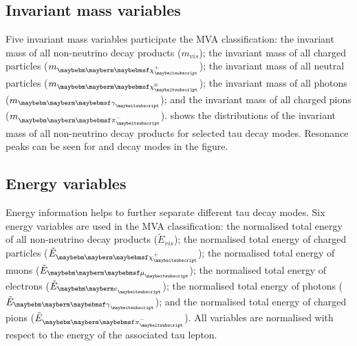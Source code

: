 
\subsection{Invariant mass variables}

Five invariant mass variables participate the MVA classification: the invariant mass of all non-neutrino decay products ($m_{vis}$); the invariant mass of all charged particles ($m_{\charge}$); the invariant mass of all neutral particles ($m_{\neutral}$); the invariant mass of all photons ($m_{\Pgg}$); and the invariant mass of all charged pions ($m_{\Pgpm}$).  shows the distributions of the invariant mass of all non-neutrino decay products for selected tau decay modes. Resonance peaks can be seen for \Prho and \Pai decay modes in the figure.


\subsection{Energy variables}

Energy information helps to further separate different tau decay modes. Six energy variables are used in the MVA classification: the normalised total energy of all non-neutrino decay products ($\tilde{E}_{vis}$); the normalised total energy of charged particles ($\tilde{E}_{\charge}$); the normalised total energy of muons ($\tilde{E}_{\Pmu}$); the normalised total energy of electrons ($\tilde{E}_{\Pe}$); the normalised total energy of photons ($\tilde{E}_{\Pgg}$); and the normalised total energy of charged pions ($\tilde{E}_{\Pgpm}$). All variables are normalised with respect to the energy of the associated tau lepton.

